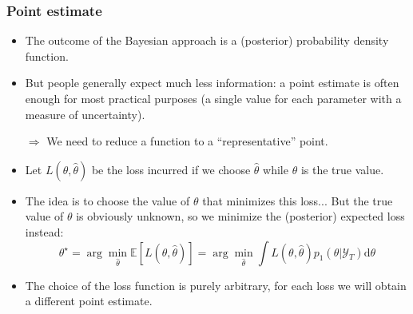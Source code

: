 \documentclass[10pt,slidestop]{beamer}
\newcommand{\AllSample}{ \mathcal Y_T }
\begin{document}
\begin{frame}
  \frametitle{Point estimate}

  \begin{itemize}
  \item The outcome of the Bayesian approach is a (posterior)
    probability density function.
  \item But people generally expect much less information: a point
    estimate is often enough for most practical purposes (a single
    value for each parameter with a measure of uncertainty).
  \item[$\Rightarrow$] We need to reduce a function to a
    ``representative'' point.
\bigskip
  \item Let $L(\theta,\widehat{\theta})$ be the loss incurred if we
    choose $\widehat{\theta}$ while $\theta$ is the true value.
\bigskip
  \item The idea is to choose the value of $\theta$ that minimizes
    this loss... But the true value of $\theta$ is obviously unknown,
    so we minimize the (posterior) expected loss instead:
      \[
      \theta^{\star} = \arg\min_{\widehat{\theta}} \mathbb E
      \left[L(\theta,\widehat{\theta})\right] =
      \arg\min_{\widehat{\theta}} \int
      L(\theta,\widehat{\theta})p_1(\theta|\AllSample)\mathrm d\theta
      \]
  \item The choice of the loss function is purely arbitrary, for each
    loss we will obtain a different point estimate.
  \end{itemize}
\end{frame}
\end{document}
